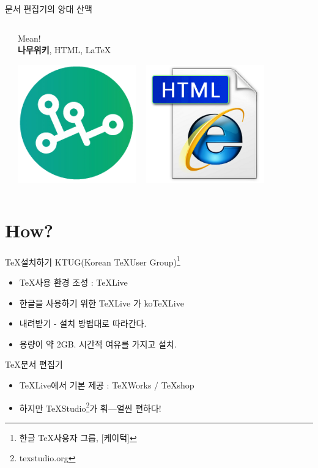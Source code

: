 \documentclass[12pt]{beamer}
\begin{document}
\begin{frame}{문서 편집기의 양대 산맥}
\begin{columns}
\begin{column}{0.5\textwidth}
		\end{column}
		\begin{column}{0.5\textwidth}
			Mean! \\
			\vfill
			\textbf{나무위키}, HTML, \LaTeX \\
			\begin{center}
				\includegraphics[width=0.4\textwidth]{namu.png}
				~
				\includegraphics[width=0.4\textwidth]{htmlicon.png}
			\end{center}
		\end{column}
	\end{columns}
\end{frame}
\section{How?}
\begin{frame}{\TeX 설치하기}
	KTUG(Korean \TeX User Group)\footnote{한글 \TeX 사용자 그룹, [케이턱]}
	\begin{itemize}
		\item \TeX 사용 환경 조성 : TeXLive
		\item 한글을 사용하기 위한 TeXLive 가 koTeXLive
		\item 내려받기 - 설치 방법대로 따라간다.
		\item 용량이 약 2GB. 시간적 여유를 가지고 설치.
	\end{itemize}
	\TeX 문서 편집기
	\begin{itemize}
		\item TeXLive에서 기본 제공 : TeXWorks / TeXshop
		\item 하지만 TeXStudio\footnote{texstudio.org}가 훠---얼씬 편하다!
	\end{itemize}
\end{frame}
\end{document}
